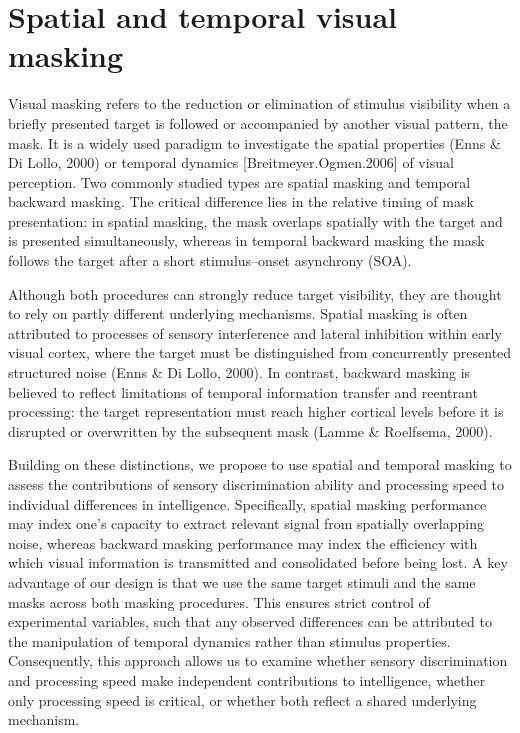 \documentclass[
  ,man]{apa6}
\begin{document}
\section{Spatial and temporal visual masking}\label{spatial-and-temporal-visual-masking}

Visual masking refers to the reduction or elimination of stimulus visibility when a briefly presented target is followed or accompanied by another visual pattern, the mask. It is a widely used paradigm to investigate the spatial properties (Enns \& Di Lollo, 2000) or temporal dynamics {[}Breitmeyer.Ogmen.2006{]} of visual perception. Two commonly studied types are spatial masking and temporal backward masking. The critical difference lies in the relative timing of mask presentation: in spatial masking, the mask overlaps spatially with the target and is presented simultaneously, whereas in temporal backward masking the mask follows the target after a short stimulus--onset asynchrony (SOA).

Although both procedures can strongly reduce target visibility, they are thought to rely on partly different underlying mechanisms. Spatial masking is often attributed to processes of sensory interference and lateral inhibition within early visual cortex, where the target must be distinguished from concurrently presented structured noise (Enns \& Di Lollo, 2000). In contrast, backward masking is believed to reflect limitations of temporal information transfer and reentrant processing: the target representation must reach higher cortical levels before it is disrupted or overwritten by the subsequent mask (Lamme \& Roelfsema, 2000).

Building on these distinctions, we propose to use spatial and temporal masking to assess the contributions of sensory discrimination ability and processing speed to individual differences in intelligence. Specifically, spatial masking performance may index one's capacity to extract relevant signal from spatially overlapping noise, whereas backward masking performance may index the efficiency with which visual information is transmitted and consolidated before being lost. A key advantage of our design is that we use the same target stimuli and the same masks across both masking procedures. This ensures strict control of experimental variables, such that any observed differences can be attributed to the manipulation of temporal dynamics rather than stimulus properties. Consequently, this approach allows us to examine whether sensory discrimination and processing speed make independent contributions to intelligence, whether only processing speed is critical, or whether both reflect a shared underlying mechanism.
\end{document}

